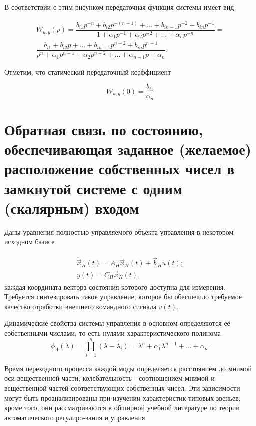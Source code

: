 В соответствии с этим рисунком передаточная функция системы имеет вид

\begin{multline}
	W_{u,y}(p) = \dfrac{b_{i1}p^{-n}+b_{i2}p^{-(n-1)}+\dots+b_{in-1}p^{-2}+b_{in}p^{-1}}{1+\alpha_1p^{-1}+\alpha_2p^{-2}+\dots+\alpha_np^{-n}} = \\
	\dfrac{b_{i1}+b_{i2}p+\dots+b_{in-1}p^{n-2}+b_{in}p^{n-1}}{p^n+\alpha_1p^{n-1}+\alpha_2p^{n-2}+\dots+\alpha_{n-1}p+\alpha_n}.
\end{multline}

Отметим, что статический передаточный коэффициент

\begin{equation}
	W_{u,y}(0)=\dfrac{b_{i1}}{\alpha_n}
\end{equation}

\newpage

\section{Обратная связь по состоянию, обеспечивающая заданное (желаемое) расположение собственных чисел в замкнутой системе с одним (скалярным) входом}

Даны уравнения полностью управляемого объекта управления в некотором исходном базисе

\begin{gather}
\begin{split}
	\dot{\vec{x}}_H(t) = A_H\vec{x}_H(t)+\vec{b}_Hu(t);\\
	y(t)=C_H\vec{x}_H(t),
\end{split}
\end{gather}
каждая координата вектора состояния которого доступна для измерения.
Требуется синтезировать такое управление, которое бы обеспечило требуемое качество отработки внешнего командного сигнала $v(t)$.

Динамические свойства системы управления в основном определяются её собственными числами, то есть нулями характеристического полинома
\begin{equation}
	\phi_A(\lambda) = \prod_{i=1}^{n}(\lambda - \lambda_i)=\lambda^n+\alpha_1\lambda^{n-1}+\dots+\alpha_n.
\end{equation}

Время переходного процесса каждой моды определяется расстоянием до мнимой оси вещественной части; колебательность - соотношением мнимой и вещественной частей соответствующих собственных чисел. Эти зависимости могут быть проанализированы при изучении характеристик типовых звеньев, кроме того, они рассматриваются в обширной учебной литературе по теории автоматического регулиро-вания и управления.

